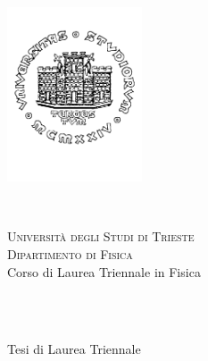\begin{titlepage}

\newcommand{\HRule}{\rule{\linewidth}{0.5mm}} %




\noindent
\begin{minipage}{.32\textwidth} %
\begin{flushleft} \large
\flushleft
\includegraphics[width=4cm]{title/sigilloUniTS.png}
\end{flushleft}
\end{minipage}
~
\begin{minipage}{0.65\textwidth}
\begin{flushright} \large
\textsc{\normalsize Università degli Studi di Trieste}\\[0.2cm] 
\textsc{\normalsize Dipartimento di Fisica }\\[0.4cm]
{\normalsize Corso di Laurea Triennale in Fisica}\\[0.3cm]

\end{flushright}
\end{minipage}\\[1cm]
\makeatother


\center %

\quad\\[1.5cm]
{\normalsize Tesi di Laurea Triennale}\\[0.5cm]


\end{titlepage}

